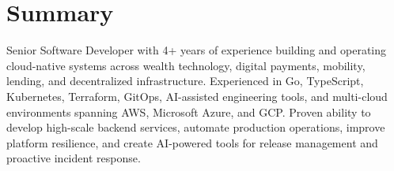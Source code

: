 \section{Summary}
Senior Software Developer with 4+ years of experience building and operating cloud-native systems across wealth technology, digital payments, mobility, lending, and decentralized infrastructure. Experienced in Go, TypeScript, Kubernetes, Terraform, GitOps, AI-assisted engineering tools, and multi-cloud environments spanning AWS, Microsoft Azure, and GCP. Proven ability to develop high-scale backend services, automate production operations, improve platform resilience, and create AI-powered tools for release management and proactive incident response.
